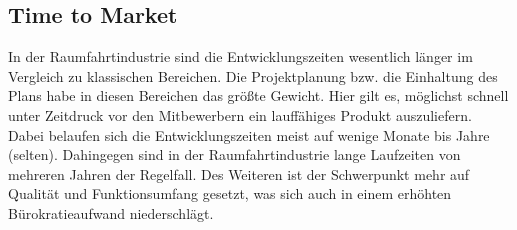 \subsection{Time to Market} %

In der Raumfahrtindustrie sind die Entwicklungszeiten wesentlich länger im Vergleich zu klassischen Bereichen.
Die Projektplanung bzw. die Einhaltung des Plans habe in diesen Bereichen das größte Gewicht. 
Hier gilt es, möglichst schnell unter Zeitdruck vor den Mitbewerbern ein lauffähiges Produkt auszuliefern.
Dabei belaufen sich die Entwicklungszeiten meist auf wenige Monate bis Jahre (selten).
Dahingegen sind in der Raumfahrtindustrie lange Laufzeiten von mehreren Jahren der Regelfall.
Des Weiteren ist der Schwerpunkt mehr auf Qualität und Funktionsumfang gesetzt, was sich auch in einem erhöhten Bürokratieaufwand niederschlägt.
\parencite[Vgl.][S. 97]{Dorfman:1999aa}


